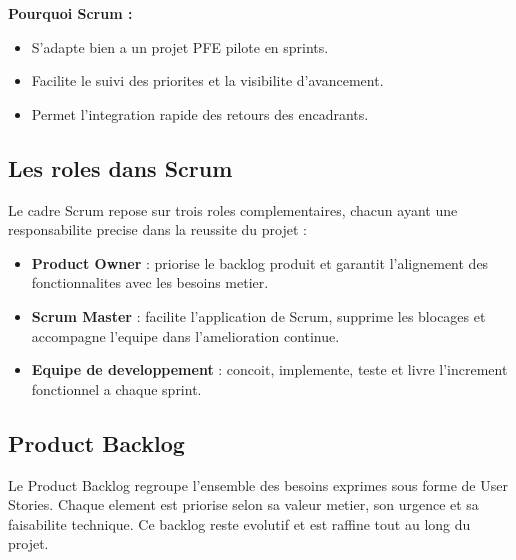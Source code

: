 \documentclass[a4paper,12pt]{report}
\begin{document}
\textbf{Pourquoi Scrum :}
\begin{itemize}
  \item S'adapte bien a un projet PFE pilote en sprints.
  \item Facilite le suivi des priorites et la visibilite d'avancement.
  \item Permet l'integration rapide des retours des encadrants.
\end{itemize}

\subsection{Les roles dans Scrum}

Le cadre Scrum repose sur trois roles complementaires, chacun ayant une
responsabilite precise dans la reussite du projet :

\begin{itemize}
  \item \textbf{Product Owner} : priorise le backlog produit et garantit
  l'alignement des fonctionnalites avec les besoins metier.
  \item \textbf{Scrum Master} : facilite l'application de Scrum, supprime les
  blocages et accompagne l'equipe dans l'amelioration continue.
  \item \textbf{Equipe de developpement} : concoit, implemente, teste et livre
  l'increment fonctionnel a chaque sprint.
\end{itemize}

\subsection{Product Backlog}

Le Product Backlog regroupe l'ensemble des besoins exprimes sous forme de User
Stories. Chaque element est priorise selon sa valeur metier, son urgence et sa
faisabilite technique. Ce backlog reste evolutif et est raffine tout au long du
projet.
\end{document}
